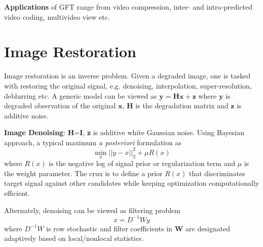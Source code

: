 \documentclass[10pt,a4paper, nocenter]{report}
\begin{document}
	\textbf{Applications} of GFT range from video compression, inter- and intra-predicted video coding, multivideo view etc.
	
	\chapter*{Image Restoration}
	\thispagestyle{fancy}
	Image restoration is an inverse problem. Given a degraded image, one is tasked with restoring the original signal, e.g. denoising, interpolation, super-resolution, deblurring etc. A generic model can be viewed as $\mathbf{y}=\mathbf{Hx} + \mathbf{z}$ where $\mathbf{y}$ is degraded observation of the original $\mathbf{x}$, $\mathbf{H}$ is the degradation matrix and $\mathbf{z}$ is additive noise.
	
	\textbf{Image Denoising}: \textbf{H}=\textbf{I}, \textbf{z} is additive white Gaussian noise. Using Bayesian approach, a typical maximum \textit{a posteriori} formulation as $$\min_{x} \lvert\lvert y-x \rvert\rvert_{2}^{2} + \mu R(x)$$ where $R(x)$ is the negative log of signal prior or regularization term and $\mu$ is the weight parameter. The crux is to define a prior $R(x)$ that discriminates target signal against other candidates while keeping optimization computationally efficient. 
	
	Alternately, denoising can be viewed as filtering problem $$x=D^{-1}Wy $$ where $D^{-1}W$ is row stochastic and filter coefficients in \textbf{W} are designated adaptively based on local/nonlocal statistics. 
	
\end{document}
